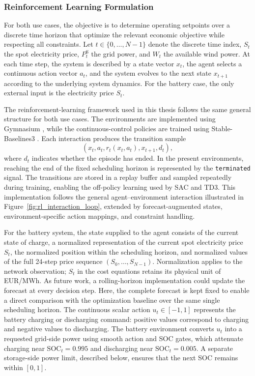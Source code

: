 \documentclass[12pt]{article}
\begin{document}
\subsubsection{Reinforcement Learning Formulation}
\label{sec:rl_framework}

For both use cases, the objective is to determine operating setpoints over a discrete time horizon that optimize the relevant economic objective while respecting all constraints. Let $t \in \{0,\ldots,N-1\}$ denote the discrete time index, $S_t$ the spot electricity price, $P_t^{\mathrm S}$ the grid power, and $W_t$ the available wind power. At each time step, the system is described by a state vector $x_t$, the agent selects a continuous action vector $a_t$, and the system evolves to the next state $x_{t+1}$ according to the underlying system dynamics. For the battery case, the only external input is the electricity price $S_t$.

The reinforcement-learning framework used in this thesis follows the same general structure for both use cases. The environments are implemented using Gymnasium \cite{towers2024gymnasium}, while the continuous-control policies are trained using Stable-Baselines3 \cite{raffin2021stablebaselines3}. Each interaction produces the transition sample
\[
\left(x_t,a_t,r_t(x_t,a_t),x_{t+1},d_t\right),
\]
where $d_t$ indicates whether the episode has ended. In the present environments, reaching the end of the fixed scheduling horizon is represented by the \texttt{terminated} signal. The transitions are stored in a replay buffer and sampled repeatedly during training, enabling the off-policy learning used by SAC and TD3.
This implementation follows the general agent--environment interaction illustrated in Figure~\ref{fig:rl_interaction_loop}, extended by forecast-augmented states, environment-specific action mappings, and constraint handling.

For the battery system, the state supplied to the agent consists of the current state of charge, a normalized representation of the current spot electricity price $S_t$, the normalized position within the scheduling horizon, and normalized values of the full 24-step price sequence $(S_0,\ldots,S_{N-1})$. Normalization applies to the network observation; $S_t$ in the cost equations retains its physical unit of EUR/MWh. As future work, a rolling-horizon implementation could update the forecast at every decision step. Here, the complete forecast is kept fixed to enable a direct comparison with the optimization baseline over the same single scheduling horizon. The continuous scalar action $u_t\in[-1,1]$ represents the battery charging or discharging command: positive values correspond to charging and negative values to discharging. The battery environment converts $u_t$ into a requested grid-side power using smooth action and SOC gates, which attenuate charging near $\mathrm{SOC}_t=0.995$ and discharging near $\mathrm{SOC}_t=0.005$. A separate storage-side power limit, described below, ensures that the next SOC remains within $[0,1]$.
\end{document}
